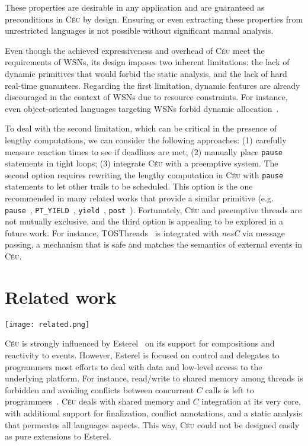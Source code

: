 \documentclass[10pt]{sensys-proc}
\newcommand{\CEU}{\textsc{C\'{e}u}\xspace}
\newcommand{\code}[1] {{\small{\texttt{#1}}}}
\begin{document}
These properties are desirable in any application and are guaranteed as 
preconditions in \CEU by design.
Ensuring or even extracting these properties from unrestricted languages is not 
possible without significant manual analysis.

Even though the achieved expressiveness and overhead of \CEU meet the 
requirements of WSNs, its design imposes two inherent limitations:
the lack of dynamic primitives that would forbid the static analysis,
and the lack of hard real-time guarantees.
%
Regarding the first limitation, dynamic features are already discouraged in the 
context of WSNs due to resource constraints.
For instance, even object-oriented languages targeting WSNs forbid dynamic 
allocation~\cite{wsn.flowtalk,wsn.virgil}.

To deal with the second limitation, which can be critical in the presence of 
lengthy computations, we can consider the following approaches:
(1) carefully measure reaction times to see if deadlines are met;
(2) manually place \code{pause} statements in tight loops;
(3) integrate \CEU with a preemptive system.
%
The second option requires rewriting the lengthy computation in \CEU with
\code{pause} statements to let other trails to be scheduled.
This option is the one recommended in many related works that provide a similar 
primitive (e.g. \code{pause}~\cite{esterel.primer}, 
\code{PT\_YIELD}~\cite{wsn.protothreads}, \code{yield}~\cite{wsn.sol}, 
\code{post}~\cite{wsn.nesc}).
%
Fortunately, \CEU and preemptive threads are not mutually exclusive, and the 
third option is appealing to be explored in a future work.
For instance, TOSThreads~\cite{wsn.tosthreads} is integrated with \emph{nesC} 
via message passing, a mechanism that is safe and matches the semantics of 
external events in \CEU.

\section{Related work}
\label{sec.related}

\begin{figure*}[t]
\texttt{[image: related.png]}
\caption{ Table of features found in related work to \CEU.
(Gray background indicates where they first appeared.)
TODO CEU
\label{fig.related}
}
\end{figure*}

\CEU is strongly influenced by Esterel~\cite{esterel.ieee91} on its support for 
compositions and reactivity to events.
However, Esterel is focused on control and delegates to programmers most 
efforts to deal with data and low-level access to the underlying platform.
For instance, read/write to shared memory among threads is forbidden and 
avoiding conflicts between concurrent $C$ calls is left to 
programmers~\cite{esterel.primer}.
\CEU deals with shared memory and $C$ integration at its very core, with 
additional support for finalization, conflict annotations, and a static 
analysis that permeates all languages aspects.
This way, \CEU could not be designed easily as pure extensions to Esterel.
\end{document}
